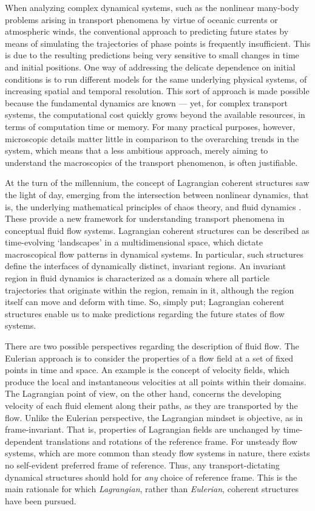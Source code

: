 When analyzing complex dynamical systems, such as the nonlinear many-body
problems arising in transport phenomena by virtue of oceanic currents or
atmospheric winds, the conventional approach to predicting future states
by means of simulating the trajectories of phase points is frequently
insufficient. This is due to the resulting predictions being very sensitive to
small changes in time and initial positions. One way of addressing the delicate
dependence on initial conditions is to run different models for the same
underlying physical systems, of increasing spatial and temporal resolution. This
sort of approach is made possible because the fundamental dynamics are known ---
yet, for complex transport systems, the computational cost quickly grows beyond
the available resources, in terms of computation time or memory. For many
practical purposes, however, microscopic details matter little in comparison to
the overarching trends in the system, which means that a less ambitious
approach, merely aiming to understand the macroscopics of the transport
phenomenon, is often justifiable.

At the turn of the millennium, the concept of Lagrangian coherent structures
saw the light of day, emerging from the intersection between nonlinear dynamics,
that is, the underlying mathematical principles of chaos theory, and fluid
dynamics \parencite{haller2000lagrangian}. These provide a new framework for
understanding transport phenomena in conceptual fluid flow systems. Lagrangian
coherent structures can be described as time-evolving `landscapes' in a
multidimensional space, which dictate macroscopical flow patterns in dynamical
systems. In particular, such structures define the interfaces of dynamically
distinct, invariant regions. An invariant region in fluid dynamics is
characterized as a domain where all particle trajectories that originate within
the region, remain in it, although the region itself can move and deform with
time. So, simply put; Lagrangian coherent structures enable us to make
predictions regarding the future states of flow systems.

There are two possible perspectives regarding the description of fluid flow.
The Eulerian approach is to consider the properties of a flow field at a set of
fixed points in time and space. An example is the concept of velocity fields,
which produce the local and instantaneous velocities at all points within their
domains. The Lagrangian point of view, on the other hand, concerns the
developing velocity of each fluid element along their paths, as they are
transported by the flow. Unlike the Eulerian perspective, the Lagrangian
mindset is objective, as in frame-invariant. That is, properties of Lagrangian
fields are unchanged by time-dependent translations and rotations of the
reference frame. For unsteady flow systems, which are more common than steady
flow systems in nature, there exists no self-evident preferred frame of
reference. Thus, any transport-dictating dynamical structures should
hold for \emph{any} choice of reference frame. This is the main
rationale for which \emph{Lagrangian}, rather than \emph{Eulerian}, coherent
structures have been pursued.


